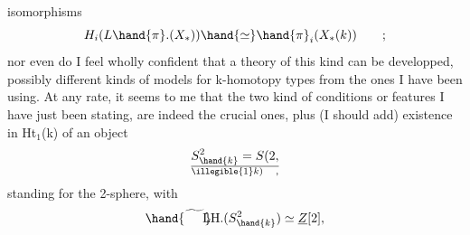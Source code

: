 isomorphisms
\[ H_i(L\hand{\pi}.(X_*)) \hand{\simeq} \hand{\pi}_i(X_*(k)) \qquad ; \]
nor even do I feel wholly confident that a theory of this kind can be
developped,   possibly different kinds of models for k-homotopy
types from the ones I have been using.  At any rate,  it seems to me 
that the two kind of conditions or features I have just been stating,
are indeed the crucial ones,  plus (I should add)  existence in Ht$_1$(k)
of an object 
\[ S^2_{\hand{k}} = S(2,\over{\illegible{1}}{k}) \quad , \]
standing for the  2-sphere,  with
\[ \hand{\widetilde{\phantom{LH}}}\!\!\!\!\mathrm{LH}.(S^2_{\hand{k}}) \simeq \underline{Z}[2] , \]

